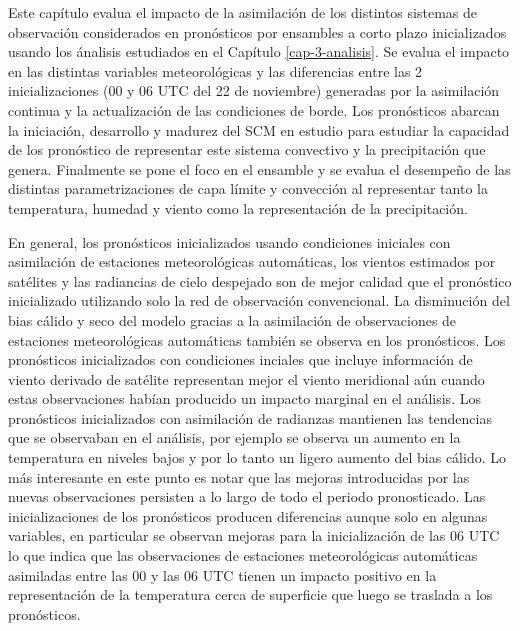 \documentclass[12pt,oneside,a4paper]{reedthesis}
\begin{document}
Este capítulo evalua el impacto de la asimilación de los distintos sistemas de observación considerados en pronósticos por ensambles a corto plazo inicializados usando los ánalisis estudiados en el Capítulo \ref{cap-3-analisis}. Se evalua el impacto en las distintas variables meteorológicas y las diferencias entre las 2 inicializaciones (00 y 06 UTC del 22 de noviembre) generadas por la asimilación continua y la actualización de las condiciones de borde. Los pronósticos abarcan la iniciación, desarrollo y madurez del SCM en estudio para estudiar la capacidad de los pronóstico de representar este sistema convectivo y la precipitación que genera. Finalmente se pone el foco en el ensamble y se evalua el desempeño de las distintas parametrizaciones de capa límite y convección al representar tanto la temperatura, humedad y viento como la representación de la precipitación.

En general, los pronósticos inicializados usando condiciones iniciales con asimilación de estaciones meteorológicas automáticas, los vientos estimados por satélites y las radiancias de cielo despejado son de mejor calidad que el pronóstico inicializado utilizando solo la red de observación convencional. La disminución del bias cálido y seco del modelo gracias a la asimilación de observaciones de estaciones meteorológicas automáticas también se observa en los pronósticos. Los pronósticos inicializados con condiciones inciales que incluye información de viento derivado de satélite representan mejor el viento meridional aún cuando estas observaciones habían producido un impacto marginal en el análisis. Los pronósticos inicializados con asimilación de radianzas mantienen las tendencias que se observaban en el análisis, por ejemplo se observa un aumento en la temperatura en niveles bajos y por lo tanto un ligero aumento del bias cálido. Lo más interesante en este punto es notar que las mejoras introducidas por las nuevas observaciones persisten a lo largo de todo el periodo pronosticado. Las inicializaciones de los pronósticos producen diferencias aunque solo en algunas variables, en particular se observan mejoras para la inicialización de las 06 UTC lo que indica que las observaciones de estaciones meteorológicas automáticas asimiladas entre las 00 y las 06 UTC tienen un impacto positivo en la representación de la temperatura cerca de superficie que luego se traslada a los pronósticos.
\end{document}
